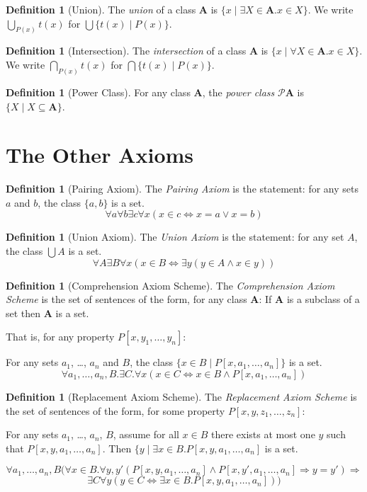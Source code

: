 \documentclass{book}
\theoremstyle{definition}
\newtheorem{df}[ax]{Definition}
\begin{document}
\begin{df}[Union]
The \emph{union} of a class $\mathbf{A}$ is $\{ x \mid \exists X \in \mathbf{A}. x \in X\}$.
We write $\bigcup_{P(x)} t(x)$ for $\bigcup \{ t(x) \mid P(x) \}$.
\end{df}

\begin{df}[Intersection]
The \emph{intersection} of a class $\mathbf{A}$ is $\{ x \mid \forall X \in \mathbf{A}. x \in X \}$. We write $\bigcap_{P(x)} t(x)$ for $\bigcap \{ t(x) \mid P(x) \}$.
\end{df}

\begin{df}[Power Class]
For any class $\mathbf{A}$, the \emph{power class} $\mathcal{P} \mathbf{A}$ is $\{ X \mid X \subseteq \mathbf{A} \}$.
\end{df}

\section{The Other Axioms}

\begin{df}[Pairing Axiom]
The \emph{Pairing Axiom} is the statement: for any sets $a$ and $b$, the class $\{a,b\}$ is a set.
\[ \forall a \forall b \exists c \forall x (x \in c \Leftrightarrow x = a \vee x = b) \]
\end{df}

\begin{df}[Union Axiom]
The \emph{Union Axiom} is the statement: for any set $A$, the class $\bigcup A$ is a set.
\[ \forall A \exists B \forall x (x \in B \Leftrightarrow \exists y (y \in A \wedge x \in y)) \]
\end{df}

\begin{df}[Comprehension Axiom Scheme]
The \emph{Comprehension Axiom Scheme} is the set of sentences of the form, for any class $\mathbf{A}$: If $\mathbf{A}$ is a subclass of a set then $\mathbf{A}$ is a set.

That is, for any property $P[x,y_1,\ldots,y_n]$:

For any sets $a_1$, \ldots, $a_n$ and $B$, the class $\{ x \in B \mid P[x,a_1, \ldots, a_n] \}$ is a set.
\[ \forall a_1, \ldots, a_n, B. \exists C. \forall x (x \in C \Leftrightarrow x \in B \wedge P[x,a_1, \ldots, a_n]) \]
\end{df}

\begin{df}[Replacement Axiom Scheme]
The \emph{Replacement Axiom Scheme} is the set of sentences of the form, for some property $P[x,y,z_1, \ldots, z_n]$:

For any sets $a_1$, \ldots, $a_n$, $B$, assume for all $x \in B$ there exists at most one $y$ such that $P[x,y,a_1, \ldots, a_n]$. Then $\{ y \mid \exists x \in B. P[x,y,a_1, \ldots, a_n]$ is a set.

\[ \forall a_1, \ldots, a_n, B (\forall x \in B. \forall y,y'(P[x,y,a_1, \ldots, a_n] \wedge P[x,y',a_1, \ldots, a_n] \Rightarrow y = y') \Rightarrow \]
\[ \exists C \forall y (y \in C \Leftrightarrow \exists x \in B. P[x,y,a_1, \ldots, a_n])) \]
\end{df}
\end{document}
